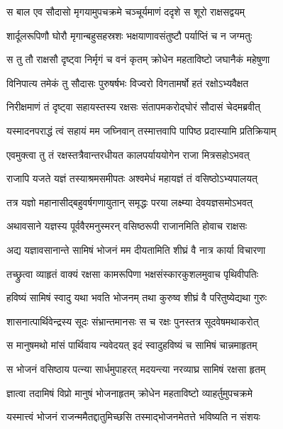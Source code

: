 \twolineshloka
{स बाल एव सौदासो मृगयामुपचक्रमे}
{चञ्चूर्यमाणं ददृशे स शूरो राक्षसद्वयम्} %

\twolineshloka
{शार्दूलरूपिणौ घोरौ मृगान्बहुसहस्रशः}
{भक्षयाणावसंतुष्टौ पर्याप्तिं च न जग्मतुः} %

\twolineshloka
{स तु तौ राक्षसौ दृष्ट्वा निर्मृगं च वनं कृतम्}
{क्रोधेन महताविष्टो जघानैकं महेषुणा} %

\twolineshloka
{विनिपात्य तमेकं तु सौदासः पुरुषर्षभः}
{विज्वरो विगतामर्षो हतं रक्षोऽभ्यवैक्षत} %

\twolineshloka
{निरीक्षमाणं तं दृष्ट्वा सहायस्तस्य रक्षसः}
{संतापमकरोद्घोरं सौदासं चेदमब्रवीत्} %

\twolineshloka
{यस्मादनपराद्धं त्वं सहायं मम जघ्निवान्}
{तस्मात्तवापि पापिष्ठ प्रदास्यामि प्रतिक्रियाम्} %

\twolineshloka
{एवमुक्त्वा तु तं रक्षस्तत्रैवान्तरधीयत}
{कालपर्याययोगेन राजा मित्रसहोऽभवत्} %

\twolineshloka
{राजापि यजते यज्ञं तस्याश्रमसमीपतः}
{अश्वमेधं महायज्ञं तं वसिष्ठोऽभ्यपालयत्} %

\twolineshloka
{तत्र यज्ञो महानासीद्बहुवर्षगणायुतान्}
{समृद्धः परया लक्ष्म्या देवयज्ञसमोऽभवत्} %

\twolineshloka
{अथावसाने यज्ञस्य पूर्ववैरमनुस्मरन्}
{वसिष्ठरूपी राजानमिति होवाच राक्षसः} %

\twolineshloka
{अद्य यज्ञावसानान्ते सामिषं भोजनं मम}
{दीयतामिति शीघ्रं वै नात्र कार्या विचारणा} %

\twolineshloka
{तच्छ्रुत्वा व्याहृतं वाक्यं रक्षसा कामरूपिणा}
{भक्षसंस्कारकुशलमुवाच पृथिवीपतिः} %

\twolineshloka
{हविष्यं सामिषं स्वादु यथा भवति भोजनम्}
{तथा कुरुष्व शीघ्रं वै परितुष्येद्यथा गुरुः} %

\twolineshloka
{शासनात्पार्थिवेन्द्रस्य सूदः संभ्रान्तमानसः}
{स च रक्षः पुनस्तत्र सूदवेषमथाकरोत्} %

\twolineshloka
{स मानुषमथो मांसं पार्थिवाय न्यवेदयत्}
{इदं स्वादुहविष्यं च सामिषं चान्नमाहृतम्} %

\twolineshloka
{स भोजनं वसिष्ठाय पत्न्या सार्धमुपाहरत्}
{मदयन्त्या नरव्याघ्र सामिषं रक्षसा हृतम्} %

\twolineshloka
{ज्ञात्वा तदामिषं विप्रो मानुषं भोजनाहृतम्}
{क्रोधेन महताविष्टो व्याहर्तुमुपचक्रमे} %

\twolineshloka
{यस्मात्त्वं भोजनं राजन्ममैतद्दातुमिच्छसि}
{तस्माद्भोजनमेतत्ते भविष्यति न संशयः} %

